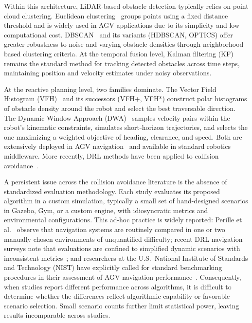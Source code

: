 \documentclass[conference]{IEEEtran}
\begin{document}
Within this architecture, LiDAR-based obstacle detection typically relies on point cloud clustering. Euclidean clustering~\cite{rusu2011pcl} groups points using a fixed distance threshold and is widely used in AGV applications due to its simplicity and low computational cost. DBSCAN~\cite{ester1996dbscan} and its variants (HDBSCAN, OPTICS) offer greater robustness to noise and varying obstacle densities through neighborhood-based clustering criteria. At the temporal fusion level, Kalman filtering (KF)~\cite{welch1995kalman} remains the standard method for tracking detected obstacles across time steps, maintaining position and velocity estimates under noisy observations.
 
At the reactive planning level, two families dominate. The Vector Field Histogram (VFH)~\cite{borenstein1991vfh} and its successors (VFH+, VFH*) construct polar histograms of obstacle density around the robot and select the best traversable direction. The Dynamic Window Approach (DWA)~\cite{fox1997dwa} samples velocity pairs within the robot's kinematic constraints, simulates short-horizon trajectories, and selects the one maximizing a weighted objective of heading, clearance, and speed. Both are extensively deployed in AGV navigation~\cite{katona2024obstacle, pavliuk2026agv} and available in standard robotics middleware. More recently, DRL methods have been applied to collision avoidance~\cite{qin2023endtoend}.
 
A persistent issue across the collision avoidance literature is the absence of standardized evaluation methodology. Each study evaluates its proposed algorithm in a custom simulation, typically a small set of hand-designed scenarios in Gazebo, Gym, or a custom engine, with idiosyncratic metrics and environmental configurations. This ad-hoc practice is widely reported: Perille et al.~\cite{perille2020barn} observe that navigation systems are routinely compared in one or two manually chosen environments of unquantified difficulty; recent DRL navigation surveys note that evaluations are confined to simplified dynamic scenarios with inconsistent metrics~\cite{sensors2025drl_survey}; and researchers at the U.S.\ National Institute of Standards and Technology (NIST) have explicitly called for standard benchmarking procedures in their assessment of AGV navigation performance~\cite{bostelman2015navigation}.
Consequently, when studies report different performance across algorithms, it is difficult to determine whether the differences reflect algorithmic capability or favorable scenario selection. Small scenario counts further limit statistical power, leaving results incomparable across studies.
 
\end{document}
